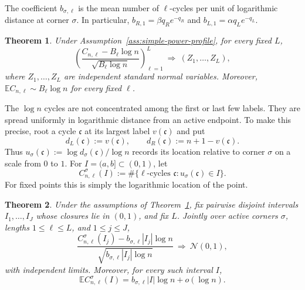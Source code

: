 \documentclass[11pt]{article}
\newtheorem{theorem}{Theorem}[section]
\theoremstyle{remark}
\theoremstyle{plain}
\newcommand{\E}{\mathbb E}
\begin{document}
The coefficient $b_{\sigma,\ell}$ is the mean number of $\ell$-cycles per
unit of logarithmic distance at corner $\sigma$.  In particular,
$b_{R,1}=\beta q_Re^{-q_R}$ and $b_{L,1}=\alpha q_Le^{-q_L}$.

\begin{theorem}
\label{thm:power-clt}
Under Assumption~\ref{ass:simple-power-profile}, for every fixed $L$,
\begin{equation}\label{eq:power-clt}
 \left(
 \frac{C_{n,\ell}-B_\ell\log n}
 {\sqrt{B_\ell\log n}}
 \right)_{\ell=1}^L
 \ \Longrightarrow\ (Z_1,\ldots,Z_L),
\end{equation}
where $Z_1,\ldots,Z_L$ are independent standard normal variables.  Moreover,
$\E C_{n,\ell}\sim B_\ell\log n$ for every fixed $\ell$.
\end{theorem}

The $\log n$ cycles are not concentrated among the first or last few labels.
They are spread uniformly in logarithmic distance from an active endpoint.
To make this precise, root a cycle $\mathfrak c$ at its largest label
$v(\mathfrak c)$ and put
\[
 d_L(\mathfrak c):=v(\mathfrak c),
 \qquad d_R(\mathfrak c):=n+1-v(\mathfrak c).
\]
Thus $u_\sigma(\mathfrak c):=\log d_\sigma(\mathfrak c)/\log n$ records its
location relative to corner $\sigma$ on a scale from $0$ to $1$.  For
$I=(a,b]\subset(0,1)$, let
\begin{equation}\label{eq:spatial-cycle-count}
 C_{n,\ell}^{\sigma}(I)
 :=\#\{\ell\text{-cycles }\mathfrak c:u_\sigma(\mathfrak c)\in I\}.
\end{equation}
For fixed points this is simply the logarithmic location of the point.

\begin{theorem}
\label{thm:power-spatial}
Under the assumptions of Theorem~\ref{thm:power-clt}, fix pairwise disjoint
intervals $I_1,\ldots,I_J$ whose closures lie in $(0,1)$, and fix $L$.
Jointly over active corners $\sigma$, lengths $1\le\ell\le L$, and
$1\le j\le J$,
\begin{equation}\label{eq:power-spatial-clt}
 \frac{C_{n,\ell}^{\sigma}(I_j)
   -b_{\sigma,\ell}|I_j|\log n}
  {\sqrt{b_{\sigma,\ell}|I_j|\log n}}
 \ \Longrightarrow\ \mathcal N(0,1),
\end{equation}
with independent limits.  Moreover, for every such interval $I$,
\begin{equation}\label{eq:power-spatial-mean}
 \E C_{n,\ell}^{\sigma}(I)
 =b_{\sigma,\ell}|I|\log n+o(\log n).
\end{equation}
\end{theorem}
\end{document}
